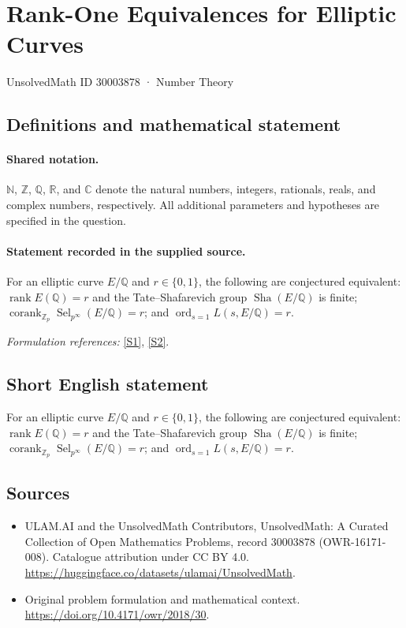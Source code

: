 \documentclass[11pt]{article}
\newcommand{\sref}[2]{\hyperlink{source:#1:#2}{[S#2]}}
\begin{document}
\setcounter{section}{30003877}
\section{Rank-One Equivalences for Elliptic Curves}\label{30003878}
{\small UnsolvedMath ID 30003878 · Number Theory}
\subsection{Definitions and mathematical statement}

\paragraph{Shared notation.}$\mathbb N$, $\mathbb Z$, $\mathbb Q$, $\mathbb R$, and $\mathbb C$ denote the natural numbers, integers, rationals, reals, and complex numbers, respectively. All additional parameters and hypotheses are specified in the question.


\paragraph{Statement recorded in the supplied source.}
For an elliptic curve $E/\mathbb{Q}$ and $r\in\{0,1\}$, the following are conjectured equivalent: $\operatorname{rank}E(\mathbb{Q})=r$ and the Tate–Shafarevich group $\operatorname{Sha}(E/\mathbb{Q})$ is finite; $\operatorname{corank}_{\mathbb{Z}_p}\operatorname{Sel}_{p^\infty}(E/\mathbb{Q})=r$; and $\operatorname{ord}_{s=1}L(s,E/\mathbb{Q})=r$.
\par\smallskip\textit{Formulation references:} \sref{30003878}{1}, \sref{30003878}{2}.
\subsection{Short English statement}
For an elliptic curve $E/\mathbb{Q}$ and $r\in\{0,1\}$, the following are conjectured equivalent: $\operatorname{rank}E(\mathbb{Q})=r$ and the Tate–Shafarevich group $\operatorname{Sha}(E/\mathbb{Q})$ is finite; $\operatorname{corank}_{\mathbb{Z}_p}\operatorname{Sel}_{p^\infty}(E/\mathbb{Q})=r$; and $\operatorname{ord}_{s=1}L(s,E/\mathbb{Q})=r$.
\subsection{Sources}
\begin{itemize}
\item[\hypertarget{source:30003878:1}{S1}] ULAM.AI and the UnsolvedMath Contributors, UnsolvedMath: A Curated Collection of Open Mathematics Problems, record 30003878 (OWR-16171-008). Catalogue attribution under CC BY 4.0.
\url{https://huggingface.co/datasets/ulamai/UnsolvedMath}.
\item[\hypertarget{source:30003878:2}{S2}] Original problem formulation and mathematical context.
\url{https://doi.org/10.4171/owr/2018/30}.
\end{itemize}
\label{end:30003878}
\end{document}
